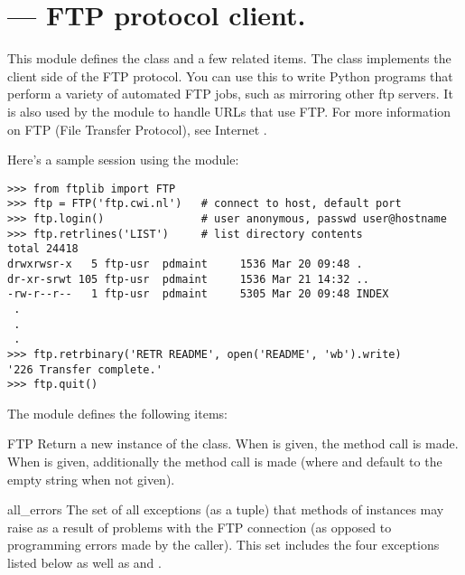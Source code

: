 \section{ ---
         FTP protocol client.}




This module defines the class  and a few related items.
The  class implements the client side of the FTP protocol.
You can use this to write Python programs that perform a variety of
automated FTP jobs, such as mirroring other ftp servers.  It is also
used by the module  to handle URLs that use FTP.  For
more information on FTP (File Transfer Protocol), see Internet
.

Here's a sample session using the  module:

\begin{verbatim}
>>> from ftplib import FTP
>>> ftp = FTP('ftp.cwi.nl')   # connect to host, default port
>>> ftp.login()               # user anonymous, passwd user@hostname
>>> ftp.retrlines('LIST')     # list directory contents
total 24418
drwxrwsr-x   5 ftp-usr  pdmaint     1536 Mar 20 09:48 .
dr-xr-srwt 105 ftp-usr  pdmaint     1536 Mar 21 14:32 ..
-rw-r--r--   1 ftp-usr  pdmaint     5305 Mar 20 09:48 INDEX
 .
 .
 .
>>> ftp.retrbinary('RETR README', open('README', 'wb').write)
'226 Transfer complete.'
>>> ftp.quit()
\end{verbatim}

The module defines the following items:

\begin{classdesc}{FTP}{}
Return a new instance of the  class.  When
 is given, the method call  is
made.  When  is given, additionally the method call
 is made (where
 and  default to the empty string when not given).
\end{classdesc}

\begin{datadesc}{all_errors}
The set of all exceptions (as a tuple) that methods of 
instances may raise as a result of problems with the FTP connection
(as opposed to programming errors made by the caller).  This set
includes the four exceptions listed below as well as
 and .
\end{datadesc}

